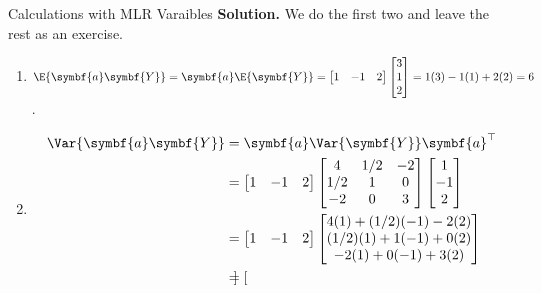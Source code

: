 \begin{Example}{Calculations with MLR Varaibles}{}
    \textbf{Solution.} We do the first two and leave the rest as an exercise.
    \begin{enumerate}[label=(\roman*)]
        \item $ \E{\symbf{a}\symbf{Y}}=\symbf{a}\E{\symbf{Y}}=
                  \begin{bmatrix}
                      1 & -1 & 2
                  \end{bmatrix}\begin{bmatrix}
                      3 \\
                      1 \\
                      2
                  \end{bmatrix}=1(3)-1(1)+2(2)=6 $.
        \item \begin{align*}
                  \Var{\symbf{a}\symbf{Y}}
                   & = \symbf{a}\Var{\symbf{Y}}\symbf{a}^\top \\
                   & =
                  \begin{bmatrix}
                      1 & -1 & 2
                  \end{bmatrix}
                  \begin{bmatrix}
                      4   & 1/2 & -2 \\
                      1/2 & 1   & 0  \\
                      -2  & 0   & 3
                  \end{bmatrix}
                  \begin{bmatrix}
                      1  \\
                      -1 \\
                      2
                  \end{bmatrix}                  \\
                   & =
                  \begin{bmatrix}
                      1 & -1 & 2
                  \end{bmatrix}
                  \begin{bmatrix}
                      4(1)+(1/2)(-1)-2(2) \\
                      (1/2)(1)+1(-1)+0(2) \\
                      -2(1)+0(-1)+3(2)
                  \end{bmatrix}                  \\
                   & =\begin{bmatrix}

\end{bmatrix}
\end{align*}
\end{enumerate}
\end{Example}
